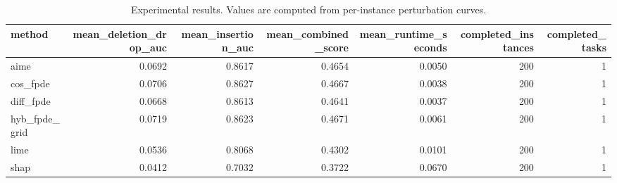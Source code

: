 \begin{table}[t]
\caption{Experimental results. Values are computed from per-instance perturbation curves.}
\label{tab:main_results_computed}
\centering
\begin{tabular}{lrrrrrr}
\toprule
method & mean\_deletion\_drop\_auc & mean\_insertion\_auc & mean\_combined\_score & mean\_runtime\_seconds & completed\_instances & completed\_tasks \\
\midrule
aime & 0.0692 & 0.8617 & 0.4654 & 0.0050 & 200 & 1 \\
cos\_fpde & 0.0706 & 0.8627 & 0.4667 & 0.0038 & 200 & 1 \\
diff\_fpde & 0.0668 & 0.8613 & 0.4641 & 0.0037 & 200 & 1 \\
hyb\_fpde\_grid & 0.0719 & 0.8623 & 0.4671 & 0.0061 & 200 & 1 \\
lime & 0.0536 & 0.8068 & 0.4302 & 0.0101 & 200 & 1 \\
shap & 0.0412 & 0.7032 & 0.3722 & 0.0670 & 200 & 1 \\
\bottomrule
\end{tabular}

\end{table}
